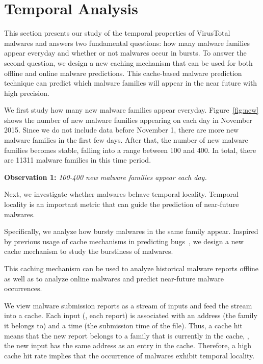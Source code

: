 \section{Temporal Analysis}
\label{sec:temporal}

This section presents our study of the temporal properties of VirusTotal malwares
and answers two fundamental questions: 
how many malware families appear everyday 
and whether or not malwares occur in bursts.
To answer the second question, we design a new caching mechanism 
that can be used for both offline and online malware predictions.
This cache-based malware prediction technique can predict which malware families will appear in the near 
future with high precision. 



We first study how many new malware families appear everyday. 
Figure~\ref{fig:new} shows the number of new malware families appearing on each day in November 2015. 
Since we do not include data before November 1, 
there are more new malware families in the first few days.
After that, the number of new malware families becomes stable, 
falling into a range between 100 and 400. 
In total, there are 11311 malware families in this time period. 

{\bf Observation 1:} 
{\em 100-400 new malware families appear each day.}




Next, we investigate whether malwares behave temporal locality.
Temporal locality is an important metric that can guide the 
prediction of near-future malwares.

Specifically, we analyze how bursty malwares in the same family appear.  
Inspired by previous usage of cache mechanisms in predicting bugs~\cite{predicting},
we design a new cache mechanism to study the burstiness of malwares.

This caching mechanism can be used to analyze historical malware reports offline 
as well as to analyze online malwares and predict near-future malware occurrences.

We view malware submission reports as a stream of inputs 
and feed the stream into a cache. 
Each input (\ie, each report) is associated with an address (the family it belongs to) and a time (the submission time of the file).
Thus, a cache hit means that the new report belongs to a family that is currently in the cache,
\ie, the new input has the same address as an entry in the cache.
Therefore, a high cache hit rate implies that the occurrence of malwares exhibit temporal locality.

